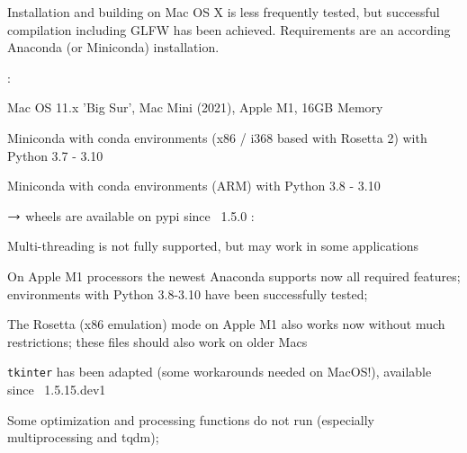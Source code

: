 \label{sec:build:MacOS}
Installation and building on Mac OS X is less frequently tested, but successful compilation including GLFW has been achieved.
Requirements are an according Anaconda (or Miniconda) installation.

\noindent {}:
\bi
  \item Mac OS 11.x 'Big Sur', Mac Mini (2021), Apple M1, 16GB Memory
  \item Miniconda with conda environments (x86 / i368 based with Rosetta 2) with Python 3.7 - 3.10
  \item Miniconda with conda environments (ARM) with Python 3.8 - 3.10
  \item[] $\rightarrow$ wheels are available on pypi since \codeName\ 1.5.0 
\ei
\noindent {}:
\bi
  \item Multi-threading is not fully supported, but may work in some applications
  \item On Apple M1 processors the newest Anaconda supports now all required features; environments with Python 3.8-3.10 have been successfully tested;
  \item The Rosetta (x86 emulation) mode on Apple M1 also works now without much restrictions; these files should also work on older Macs
  \item \texttt{tkinter} has been adapted (some workarounds needed on MacOS!), available since \codeName\ 1.5.15.dev1
  \item Some optimization and processing functions do not run (especially multiprocessing and tqdm); 
\ei

